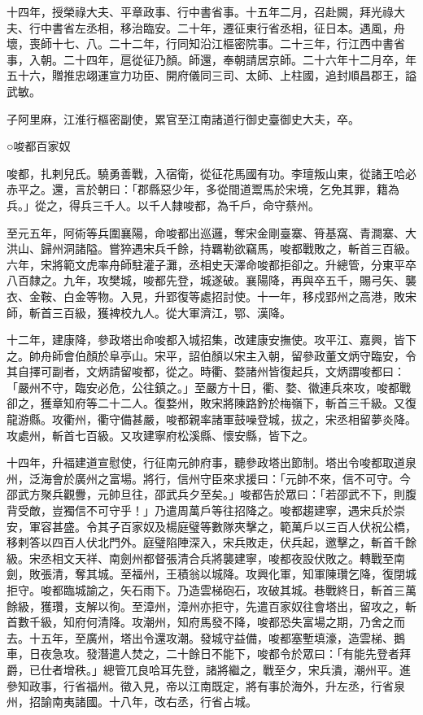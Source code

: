 \begin{pinyinscope}
 十四年，授榮祿大夫、平章政事、行中書省事。十五年二月，召赴闕，拜光祿大夫、行中書省左丞相，移治臨安。二十年，遷征東行省丞相，征日本。遇風，舟壞，喪師十七、八。二十二年，行同知沿江樞密院事。二十三年，行江西中書省事，入朝。二十四年，扈從征乃顏。師還，奉朝請居京師。二十六年十二月卒，年五十六，贈推忠翊運宣力功臣、開府儀同三司、太師、上柱國，追封順昌郡王，謚武敏。



 子阿里麻，江淮行樞密副使，累官至江南諸道行御史臺御史大夫，卒。



 ○唆都百家奴



 唆都，扎剌兒氏。驍勇善戰，入宿衛，從征花馬國有功。李璮叛山東，從諸王哈必赤平之。還，言於朝曰：「郡縣惡少年，多從間道鬻馬於宋境，乞免其罪，籍為兵。」從之，得兵三千人。以千人隸唆都，為千戶，命守蔡州。



 至元五年，阿術等兵圍襄陽，命唆都出巡邏，奪宋金剛臺寨、筲基窩、青澗寨、大洪山、歸州洞諸隘。嘗猝遇宋兵千餘，持羈勒欲竊馬，唆都戰敗之，斬首三百級。六年，宋將範文虎率舟師駐灌子灘，丞相史天澤命唆都拒卻之。升總管，分東平卒八百隸之。九年，攻樊城，唆都先登，城遂破。襄陽降，再與卒五千，賜弓矢、襲衣、金鞍、白金等物。入見，升郢復等處招討使。十一年，移戍郢州之高港，敗宋師，斬首三百級，獲裨校九人。從大軍濟江，鄂、漢降。



 十二年，建康降，參政塔出命唆都入城招集，改建康安撫使。攻平江、嘉興，皆下之。帥舟師會伯顏於阜亭山。宋平，詔伯顏以宋主入朝，留參政董文炳守臨安，令其自擇可副者，文炳請留唆都，從之。時衢、婺諸州皆復起兵，文炳謂唆都曰：「嚴州不守，臨安必危，公往鎮之。」至嚴方十日，衢、婺、徽連兵來攻，唆都戰卻之，獲章知府等二十二人。復婺州，敗宋將陳路鈐於梅嶺下，斬首三千級。又復龍游縣。攻衢州，衢守備甚嚴，唆都親率諸軍鼓噪登城，拔之，宋丞相留夢炎降。攻處州，斬首七百級。又攻建寧府松溪縣、懷安縣，皆下之。



 十四年，升福建道宣慰使，行征南元帥府事，聽參政塔出節制。塔出令唆都取道泉州，泛海會於廣州之富場。將行，信州守臣來求援曰：「元帥不來，信不可守。今邵武方聚兵觀釁，元帥旦往，邵武兵夕至矣。」唆都告於眾曰：「若邵武不下，則腹背受敵，豈獨信不可守乎！」乃遣周萬戶等往招降之。唆都趨建寧，遇宋兵於崇安，軍容甚盛。令其子百家奴及楊庭璧等數隊夾擊之，範萬戶以三百人伏祝公橋，移剌答以四百人伏北門外。庭璧陷陣深入，宋兵敗走，伏兵起，邀擊之，斬首千餘級。宋丞相文天祥、南劍州都督張清合兵將襲建寧，唆都夜設伏敗之。轉戰至南劍，敗張清，奪其城。至福州，王積翁以城降。攻興化軍，知軍陳瓚乞降，復閉城拒守。唆都臨城諭之，矢石雨下。乃造雲梯砲石，攻破其城。巷戰終日，斬首三萬餘級，獲瓚，支解以徇。至漳州，漳州亦拒守，先遣百家奴往會塔出，留攻之，斬首數千級，知府何清降。攻潮州，知府馬發不降，唆都恐失富場之期，乃舍之而去。十五年，至廣州，塔出令還攻潮。發城守益備，唆都塞塹填濠，造雲梯、鵝車，日夜急攻。發潛遣人焚之，二十餘日不能下，唆都令於眾曰：「有能先登者拜爵，已仕者增秩。」總管兀良哈耳先登，諸將繼之，戰至夕，宋兵潰，潮州平。進參知政事，行省福州。徵入見，帝以江南既定，將有事於海外，升左丞，行省泉州，招諭南夷諸國。十八年，改右丞，行省占城。




\end{pinyinscope}
